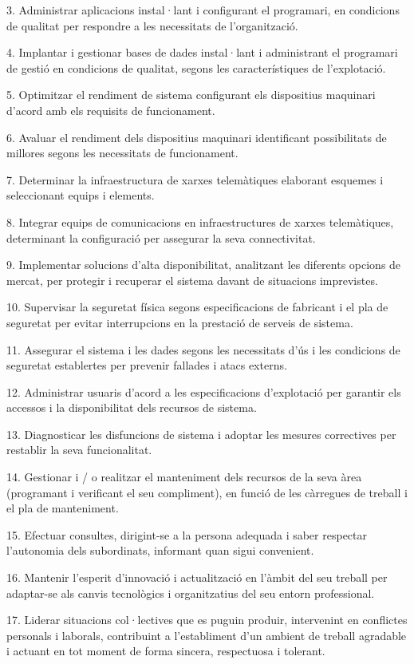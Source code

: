 \documentclass[catalan, a4paper, 12pt, titlepage]{article}
\begin{document}
3. Administrar aplicacions instal·lant i configurant el programari, en condicions de qualitat per respondre a les necessitats de l'organització.

4. Implantar i gestionar bases de dades instal·lant i administrant el programari de gestió en condicions de qualitat, segons les característiques de l'explotació.

5. Optimitzar el rendiment de sistema configurant els dispositius maquinari d'acord amb els requisits de funcionament.

6. Avaluar el rendiment dels dispositius maquinari identificant possibilitats de millores segons les necessitats de funcionament.

7. Determinar la infraestructura de xarxes telemàtiques elaborant esquemes i seleccionant equips i elements.

8. Integrar equips de comunicacions en infraestructures de xarxes telemàtiques, determinant la configuració per assegurar la seva connectivitat.

9. Implementar solucions d'alta disponibilitat, analitzant les diferents opcions de mercat, per protegir i recuperar el sistema davant de situacions imprevistes.

10. Supervisar la seguretat física segons especificacions de fabricant i el pla de seguretat per evitar interrupcions en la prestació de serveis de sistema.

11. Assegurar el sistema i les dades segons les necessitats d'ús i les condicions de seguretat establertes per prevenir fallades i atacs externs.

12. Administrar usuaris d'acord a les especificacions d'explotació per garantir els accessos i la disponibilitat dels recursos de sistema.

13. Diagnosticar les disfuncions de sistema i adoptar les mesures correctives per restablir la seva funcionalitat.

14. Gestionar i / o realitzar el manteniment dels recursos de la seva àrea (programant i verificant el seu compliment), en funció de les càrregues de treball i el pla de manteniment.

15. Efectuar consultes, dirigint-se a la persona adequada i saber respectar l'autonomia dels subordinats, informant quan sigui convenient.

16. Mantenir l'esperit d'innovació i actualització en l'àmbit del seu treball per adaptar-se als canvis tecnològics i organitzatius del seu entorn professional.

17. Liderar situacions col·lectives que es puguin produir, intervenint en conflictes personals i laborals, contribuint a l'establiment d'un ambient de treball agradable i actuant en tot moment de forma sincera, respectuosa i tolerant.
\end{document}

